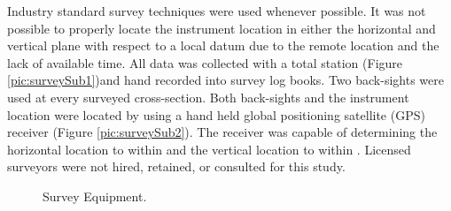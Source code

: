 \begin{linenumbers}
Industry standard survey techniques were used whenever possible.  It was not possible to properly locate the instrument location in either the horizontal and vertical plane with respect to a local datum due to the remote location and the lack of available time.  All data was collected with a total station (Figure \ref{pic:surveySub1})and hand recorded into survey log books.  Two back-sights were used at every surveyed cross-section.  Both back-sights and the instrument location were located by using a hand held global positioning satellite (GPS) receiver (Figure \ref{pic:surveySub2}).  The receiver was capable of determining the horizontal location to within  and the vertical location to within .  Licensed surveyors were not hired, retained, or consulted for this study.

\begin{figure}[htbp]
	\hspace{4em}%
	\caption[Survey Equipment.]{Survey Equipment.}
	\label{pic:surveyEquip}
\end{figure}


\end{linenumbers}
